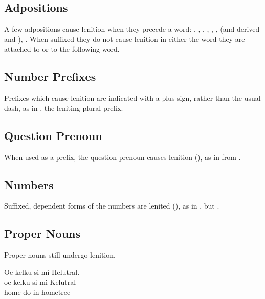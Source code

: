 \subsection{Adpositions} A few adpositions cause lenition when they
precede a word: , , , , , ,
 (and derived  and ), . When suffixed
they do not cause lenition in either the word they are attached to or
to the following word.

\subsection{Number Prefixes} Prefixes which cause lenition are
indicated with a plus sign, rather than the usual dash, as in ,
the leniting plural prefix. 

\subsection{Question Prenoun} When used as a prefix, the question
prenoun  causes lenition (), as
in   from  .

\subsection{Numbers}
Suffixed, dependent forms of the numbers are lenited
(), as in  ,
but  .

\subsection{Proper Nouns} Proper nouns still undergo lenition.

\begin{interlin} \label{lenition:ex01}
\glll Oe kelku si mì Helutral. \\
      oe kelku si mì Kelutral \\
      home do in hometree \\
\end{interlin}


